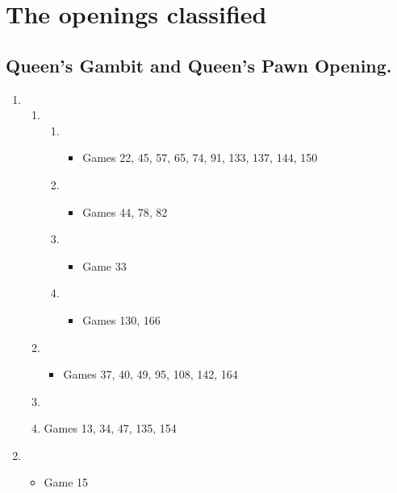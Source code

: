 \chapter{The openings classified}


\section{Queen's Gambit and Queen's Pawn Opening.}

\begin{enumerate}
\item \newgame{}
\begin{enumerate}
\item {}
\begin{enumerate}
\item {}
\begin{itemize}
\item Games 22, 45, 57, 65, 74, 91, 133, 137, 144, 150
\end{itemize}
\item {}
\begin{itemize}
\item Games 44, 78, 82
\end{itemize}
\item {}
\begin{itemize}
\item Game 33 
\end{itemize}
\item {}
\begin{itemize}
\item Games 130, 166
\end{itemize}
\end{enumerate}
\item {}
\begin{itemize}
\item Games 37, 40, 49, 95, 108, 142, 164
\end{itemize}
\item {}
\item Games 13, 34, 47, 135, 154
\end{enumerate}
\item \newgame{}
\begin{itemize}
\item Game 15

\end{itemize}
\end{enumerate}
